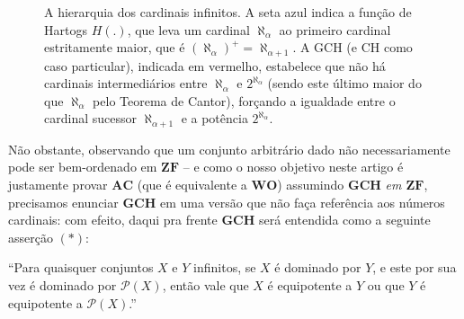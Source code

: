 \documentclass{hipatia}
\newcommand{\partes}[1]{\mathcal{P}(#1)}
\newcommand{\wo}{\mathbf{WO}}
\newcommand{\gch}{\mathbf{GCH}}
\newcommand{\ac}{\mathbf{AC}}
\newcommand{\zf}{\mathbf{ZF}}
\begin{document}
\begin{figure}[htb!]
\begin{center}
\end{center}
\caption{A hierarquia dos cardinais infinitos. 
A seta azul indica a função de Hartogs $H(.)$, 
que leva um cardinal $\aleph_\alpha$ ao primeiro 
cardinal estritamente maior, que é
$(\aleph_\alpha)^+ = \aleph_{\alpha + 1}$. 
A GCH (e CH como caso particular), 
indicada em vermelho, estabelece que não há 
cardinais intermediários
entre $\aleph_\alpha$ e $2^{\aleph_\alpha}$ 
(sendo este último maior do que $\aleph_\alpha$ 
pelo Teorema de Cantor),
forçando a igualdade entre o cardinal sucessor 
$\aleph_{\alpha+1}$ e a potência $2^{\aleph_\alpha}$.}
\end{figure}

Não obstante, observando que um conjunto arbitrário dado não necessariamente pode ser
bem-ordenado em $\zf$ -- e como o nosso objetivo neste artigo é
justamente provar $\ac$ (que é equivalente a $\wo$) assumindo $\gch$ {\it em $\zf$},
precisamos enunciar $\gch$ em uma versão que não faça referência
aos números cardinais: com efeito, daqui pra frente $\gch$ será
entendida como a seguinte asserção $(*)$:

``Para quaisquer conjuntos $X$ e $Y$ infinitos, se $X$ é
dominado por $Y$, e este por sua vez é dominado por
$\partes{X}$, então vale que $X$ é equipotente a $Y$ ou que
$Y$ é equipotente a $\partes{X}$.''
\end{document}
